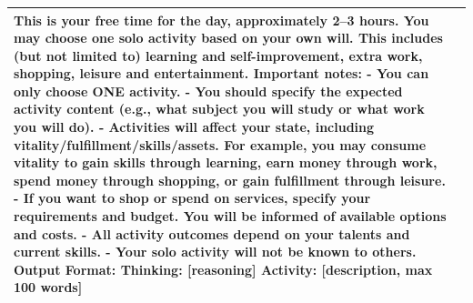 \begin{table}[h]
\begin{tabular}{p{0.8in}p{4.3in}}
This is your free time for the day, approximately 2--3 hours. You may choose one solo activity based on your own will. This includes (but not limited to) learning and self-improvement, extra work, shopping, leisure and entertainment.
\vspace{4pt}\newline
\textbf{Important notes:}
\newline - You can only choose ONE activity.
\newline - You should specify the expected activity content (e.g., what subject you will study or what work you will do).
\newline - Activities will affect your state, including vitality/fulfillment/skills/assets. For example, you may consume vitality to gain skills through learning, earn money through work, spend money through shopping, or gain fulfillment through leisure.
\newline - If you want to shop or spend on services, specify your requirements and budget. You will be informed of available options and costs.
\newline - All activity outcomes depend on your talents and current skills.
\newline - Your solo activity will not be known to others.
\vspace{4pt}\newline
\textbf{Output Format:}
\newline Thinking: [reasoning]
\newline Activity: [description, max 100 words]

\\
\bottomrule
\end{tabular}
\end{table}



